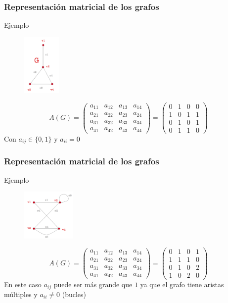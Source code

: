\documentclass{beamer}
\begin{document}
\begin{frame}
\frametitle{Representaci\'on matricial de los grafos}
\begin{block}{Ejemplo}
\begin{figure}[h]
 \label{fig:volumen}
\centering
\includegraphics[height=3cm]{g3}
\end{figure}

\[A(G) = \left(\begin{array}{cccc}a_{11} & a_{12} & a_{13} & a_{14} \\a_{21} & a_{22} & a_{23} & a_{24} \\a_{31} & a_{32} & a_{33} & a_{34} \\a_{41} & a_{42} & a_{43} & a_{44}\end{array}\right) = \left(\begin{array}{cccc}0 & 1 & 0 & 0 \\1 & 0 & 1 & 1 \\0 & 1 & 0 & 1 \\0 & 1 & 1 & 0\end{array}\right)\]
Con $a_{ij}\in\{0,1\}$ y $a_{ii} = 0$
\end{block}
\end{frame}



\begin{frame}
\frametitle{Representaci\'on matricial de los grafos}
\begin{block}{Ejemplo}
\begin{figure}[h]
 \label{fig:volum}
\centering
\includegraphics[height=2.5cm]{g4}
\end{figure}
\[A(G) = \left(\begin{array}{cccc}a_{11} & a_{12} & a_{13} & a_{14} \\a_{21} & a_{22} & a_{23} & a_{24} \\a_{31} & a_{32} & a_{33} & a_{34} \\a_{41} & a_{42} & a_{43} & a_{44}\end{array}\right) = \left(\begin{array}{cccc}0 & 1 & 0 & 1 \\1 & 1 & 1 & 0 \\0 & 1 & 0 & 2 \\1 & 0 & 2 & 0\end{array}\right)\]
En este caso $a_{ij}$ puede ser m\'as grande que $1$ ya que el grafo tiene aristas m\'ultiples y $a_{ii}\neq 0$ (bucles)
\end{block}
\end{frame}
\end{document}
